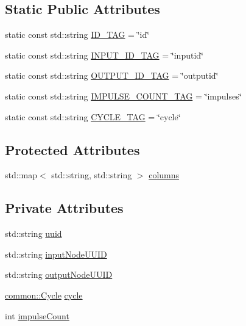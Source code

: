 \subsection*{\-Static \-Public \-Attributes}
\begin{DoxyCompactItemize}
\item 
static const std\-::string \hyperlink{classcryomesh_1_1manager_1_1ConnectionDatabaseObject_ad04bc9639dd0ceed8d559f63cdc0c025}{\-I\-D\-\_\-\-T\-A\-G} = \char`\"{}id\char`\"{}
\item 
static const std\-::string \hyperlink{classcryomesh_1_1manager_1_1ConnectionDatabaseObject_a00720d641e03f298f88c5431d948fa1a}{\-I\-N\-P\-U\-T\-\_\-\-I\-D\-\_\-\-T\-A\-G} = \char`\"{}inputid\char`\"{}
\item 
static const std\-::string \hyperlink{classcryomesh_1_1manager_1_1ConnectionDatabaseObject_ac0ee0b21e1f626b12b125987283f7ebb}{\-O\-U\-T\-P\-U\-T\-\_\-\-I\-D\-\_\-\-T\-A\-G} = \char`\"{}outputid\char`\"{}
\item 
static const std\-::string \hyperlink{classcryomesh_1_1manager_1_1ConnectionDatabaseObject_a5e1505fdea7990278b9055b87d1071ef}{\-I\-M\-P\-U\-L\-S\-E\-\_\-\-C\-O\-U\-N\-T\-\_\-\-T\-A\-G} = \char`\"{}impulses\char`\"{}
\item 
static const std\-::string \hyperlink{classcryomesh_1_1manager_1_1ConnectionDatabaseObject_a6af5ded40e1ecffc6dbe072b68a7a153}{\-C\-Y\-C\-L\-E\-\_\-\-T\-A\-G} = \char`\"{}cycle\char`\"{}
\end{DoxyCompactItemize}
\subsection*{\-Protected \-Attributes}
\begin{DoxyCompactItemize}
\item 
std\-::map$<$ std\-::string, \*
std\-::string $>$ \hyperlink{classcryomesh_1_1manager_1_1DatabaseObject_a9c648bf09b9fd8b4d599b0d4f4abf531}{columns}
\end{DoxyCompactItemize}
\subsection*{\-Private \-Attributes}
\begin{DoxyCompactItemize}
\item 
std\-::string \hyperlink{classcryomesh_1_1manager_1_1ConnectionDatabaseObject_a31eb0b099470e77da0a89c5cef9d6f68}{uuid}
\item 
std\-::string \hyperlink{classcryomesh_1_1manager_1_1ConnectionDatabaseObject_a06774523f087375aaf58b69006b2943d}{input\-Node\-U\-U\-I\-D}
\item 
std\-::string \hyperlink{classcryomesh_1_1manager_1_1ConnectionDatabaseObject_a0b7a3185c6ef946c0afe806a364d13d5}{output\-Node\-U\-U\-I\-D}
\item 
\hyperlink{classcryomesh_1_1common_1_1Cycle}{common\-::\-Cycle} \hyperlink{classcryomesh_1_1manager_1_1ConnectionDatabaseObject_a481ed7a285f11016e6f6182293cca49f}{cycle}
\item 
int \hyperlink{classcryomesh_1_1manager_1_1ConnectionDatabaseObject_ae78ea47f996ccda8b67325edc74922c3}{impulse\-Count}
\end{DoxyCompactItemize}


